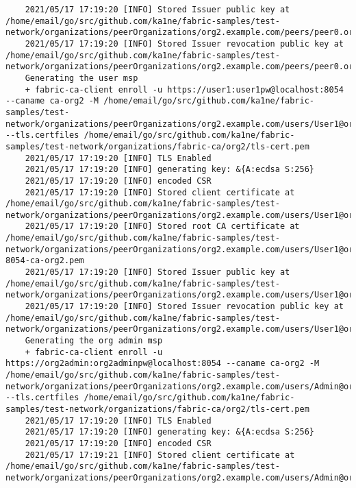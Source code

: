 \begin{lstlisting}
    2021/05/17 17:19:20 [INFO] Stored Issuer public key at /home/email/go/src/github.com/ka1ne/fabric-samples/test-network/organizations/peerOrganizations/org2.example.com/peers/peer0.org2.example.com/tls/IssuerPublicKey
    2021/05/17 17:19:20 [INFO] Stored Issuer revocation public key at /home/email/go/src/github.com/ka1ne/fabric-samples/test-network/organizations/peerOrganizations/org2.example.com/peers/peer0.org2.example.com/tls/IssuerRevocationPublicKey
    Generating the user msp
    + fabric-ca-client enroll -u https://user1:user1pw@localhost:8054 --caname ca-org2 -M /home/email/go/src/github.com/ka1ne/fabric-samples/test-network/organizations/peerOrganizations/org2.example.com/users/User1@org2.example.com/msp --tls.certfiles /home/email/go/src/github.com/ka1ne/fabric-samples/test-network/organizations/fabric-ca/org2/tls-cert.pem
    2021/05/17 17:19:20 [INFO] TLS Enabled
    2021/05/17 17:19:20 [INFO] generating key: &{A:ecdsa S:256}
    2021/05/17 17:19:20 [INFO] encoded CSR
    2021/05/17 17:19:20 [INFO] Stored client certificate at /home/email/go/src/github.com/ka1ne/fabric-samples/test-network/organizations/peerOrganizations/org2.example.com/users/User1@org2.example.com/msp/signcerts/cert.pem
    2021/05/17 17:19:20 [INFO] Stored root CA certificate at /home/email/go/src/github.com/ka1ne/fabric-samples/test-network/organizations/peerOrganizations/org2.example.com/users/User1@org2.example.com/msp/cacerts/localhost-8054-ca-org2.pem
    2021/05/17 17:19:20 [INFO] Stored Issuer public key at /home/email/go/src/github.com/ka1ne/fabric-samples/test-network/organizations/peerOrganizations/org2.example.com/users/User1@org2.example.com/msp/IssuerPublicKey
    2021/05/17 17:19:20 [INFO] Stored Issuer revocation public key at /home/email/go/src/github.com/ka1ne/fabric-samples/test-network/organizations/peerOrganizations/org2.example.com/users/User1@org2.example.com/msp/IssuerRevocationPublicKey
    Generating the org admin msp
    + fabric-ca-client enroll -u https://org2admin:org2adminpw@localhost:8054 --caname ca-org2 -M /home/email/go/src/github.com/ka1ne/fabric-samples/test-network/organizations/peerOrganizations/org2.example.com/users/Admin@org2.example.com/msp --tls.certfiles /home/email/go/src/github.com/ka1ne/fabric-samples/test-network/organizations/fabric-ca/org2/tls-cert.pem
    2021/05/17 17:19:20 [INFO] TLS Enabled
    2021/05/17 17:19:20 [INFO] generating key: &{A:ecdsa S:256}
    2021/05/17 17:19:20 [INFO] encoded CSR
    2021/05/17 17:19:21 [INFO] Stored client certificate at /home/email/go/src/github.com/ka1ne/fabric-samples/test-network/organizations/peerOrganizations/org2.example.com/users/Admin@org2.example.com/msp/signcerts/cert.pem

\end{lstlisting}
